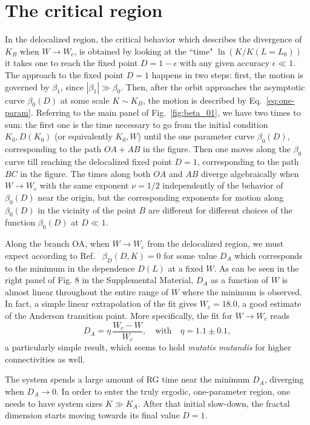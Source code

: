 \documentclass[reprint,aps,prl,superscriptaddress,english,nolongbibliography]{revtex4-1}
\begin{document}
\section*{The critical region}
In the delocalized region, the critical behavior which describes the divergence of $K_B$ when $W\to W_c$, is obtained by looking at the ``time" $\ln(K/K(L=L_{0}))$ it takes one to reach the fixed point $D=1-\epsilon$ with any given accuracy $\epsilon\ll 1$. The approach to the fixed point $D=1$ happens in two steps: first, the motion is governed by $\beta_1$, since $|\beta_1| \gg \beta_0$. Then, after the orbit approaches the asymptotic curve $\beta_0(D)$ at some scale $K\sim K_B$, the motion is described by Eq.~\eqref{eq:one-param}. 
Referring to the main panel of Fig.~\ref{fig:beta_01}, we have two times to sum: the first one is the time necessary to go from the initial condition $K_0, D(K_0)$ (or equivalently $K_0,W$) until the one parameter curve $\beta_0(D)$, corresponding to the path $OA + AB$ in the figure. Then one moves along the $\beta_0$ curve till reaching the delocalized fixed point $D=1$, corresponding to the path $BC$ in the figure. The times along both $OA$ and $AB$ diverge algebraically when $W\to W_c$ with the same exponent $\nu=1/2$  independently of the behavior of $\beta_{0}(D)$ near the origin, but the corresponding exponents for motion along $\beta_{0}(D)$ in the vicinity of the point $B$ are different for different choices of the function $\beta_{0}(D)$ at $D\ll 1$.

Along the branch OA, when $W\to W_c$ from the delocalized region, we must expect according to Ref.~\cite{tikhonov2016Anderson, Altshuler2016Nonergodic} $\beta_D(D,K) = 0$ for some value $D_A$ which corresponds to the minimum in the dependence $D(L)$ at a fixed $W$.
As can be seen in the right panel of Fig. 8 in the Supplemental Material, $D_A$ as a function of $W$ is almost linear throughout the entire range of $W$ where the minimum is observed. In fact, a simple linear extrapolation of the fit gives $W_c=18.0$, a good estimate of the Anderson transition point. More specifically, the fit for $W\to W_c$ reads
\begin{equation}
    D_A=\eta \, \frac{W_c-W}{W_c}, \quad\mathrm{with}\quad \eta=1.1\pm 0.1,
    \label{eq:D0num}
\end{equation}
a particularly simple result, which seems to hold {\it mutatis mutandis} for higher connectivities as well. 
 
The system spends a large amount of RG time near the minimum $D_A$, diverging when $D_A\to 0$. In order to enter the truly ergodic, one-parameter region, one needs to have system sizes $K\gg K_A$. After that initial slow-down, the fractal dimension starts moving towards its final value $D=1$.
\end{document}
